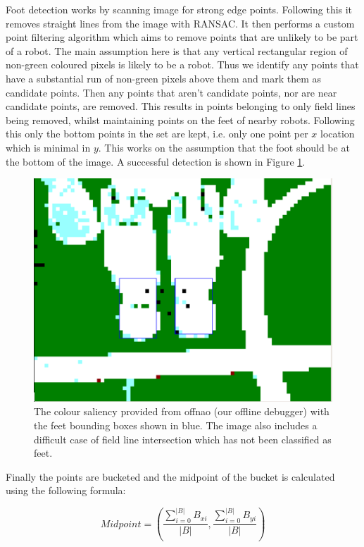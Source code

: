 \documentclass[runningheads,a4paper]{llncs}
\begin{document}
Foot detection works by scanning image for strong edge points. Following this it removes straight lines from the image with RANSAC. It then performs a custom point filtering algorithm which aims to remove points that are unlikely to be part of a robot. The main assumption here is that any vertical rectangular region of non-green coloured pixels is likely to be a robot. Thus we identify any points that have a substantial run of non-green pixels above them and mark them as candidate points. Then any points that aren't candidate points, nor are near candidate points, are removed. This results in points belonging to only field lines being removed, whilst maintaining points on the feet of nearby robots. Following this only the bottom points in the set are kept, i.e. only one point per $x$ location which is minimal in $y$. This works on the assumption that the foot should be at the bottom of the image. A successful detection is shown in Figure \ref{figFeet}.

\begin{figure}[h]
\centering
\includegraphics[scale=0.7]{Figures/figFeet}
\caption{
   The colour saliency provided from offnao (our offline debugger) with the feet bounding boxes shown in blue. The image also includes a difficult case of field line intersection which has not been classified as feet.
}
\label{figFeet}
\end{figure}

Finally the points are bucketed and the midpoint of the bucket is calculated using the following formula:

\begin{equation}
Midpoint = (\frac{\sum_{i=0}^{|B|} B_{xi}}{|B|}, \frac{\sum_{i=0}^{|B|} B_{yi}}{|B|}  )
\end{equation}
\end{document}
